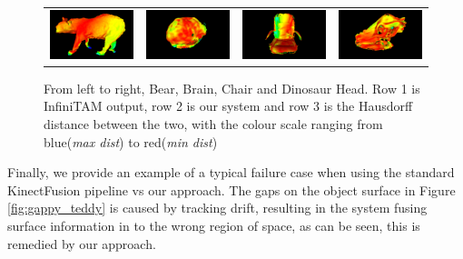 \begin{figure}[!t]
\begin{tabular}{cccc}
		\includegraphics[width=3cm]{hausdorff/bear.png}&
		\includegraphics[width=3cm]{hausdorff/brain.png}&
		\includegraphics[width=3cm]{hausdorff/chair.png}&
		\includegraphics[width=3cm]{hausdorff/dino.png}\\
	\end{tabular}
	\vspace{-3mm}
	\caption{
		From left to right, Bear, Brain, Chair and Dinosaur Head. Row 1 is InfiniTAM output, row 2 is our system and row 3 is the Hausdorff distance between the two, with the colour scale ranging from blue(\textit{max dist}) to red(\textit{min dist})
	}
		\vspace{-5mm}
	\label{fig:demo}
\end{figure}
Finally, we provide an example of a typical failure case when using the standard KinectFusion pipeline vs our approach. The gaps on the object surface in Figure \ref{fig:gappy_teddy} 
is caused by tracking drift, resulting in the system fusing surface information in to the wrong region of space, as can be seen, this is remedied by our approach.
